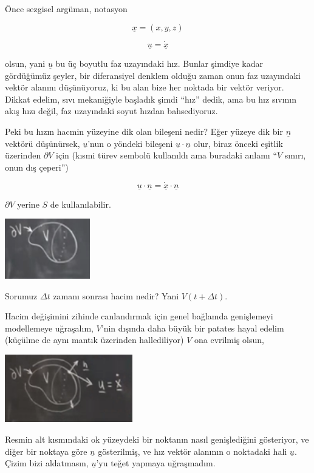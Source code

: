 \documentclass[12pt,fleqn]{article}\usepackage{../../common}
\begin{document}
Önce sezgisel argüman, notasyon 

$$ \underline{x} = (x,y,z)$$

$$ \underline{u} = \dot{\underline{x}} $$

olsun, yani $\underline{u}$ bu üç boyutlu faz uzayındaki hız. Bunlar şimdiye
kadar gördüğümüz şeyler, bir diferansiyel denklem olduğu zaman onun faz
uzayındaki vektör alanını düşünüyoruz, ki bu alan bize her noktada bir
vektör veriyor. Dikkat edelim, sıvı mekaniğiyle başladık şimdi ``hız''
dedik, ama bu hız sıvının akış hızı değil, faz uzayındaki soyut hızdan
bahsediyoruz.

Peki bu hızın hacmin yüzeyine dik olan bileşeni nedir? Eğer yüzeye dik bir
$\underline{n}$ vektörü düşünürsek, $\underline{u}$'nun o yöndeki bileşeni
$\underline{u} \cdot \underline{n}$ olur, biraz önceki eşitlik üzerinden
${\partial V}$ için (kısmi türev sembolü kullanıldı ama buradaki anlamı
``$V$ sınırı, onun dış çeperi'')

$$ 
\underline{u} \cdot \underline{n} = \dot{\underline{x}} \cdot \underline{n}
$$

${\partial V}$ yerine $S$ de kullanılabilir. 

\includegraphics[width=10em]{16_02.png}

Sorumuz $\Delta t$ zamanı sonrası hacim nedir? Yani $V(t + \Delta t)$. 

Hacim değişimini zihinde canlandırmak için genel bağlamda genişlemeyi
modellemeye uğraşalım, $V$'nin dışında daha büyük bir patates hayal edelim
(küçülme de aynı mantık üzerinden hallediliyor) $V$ ona evrilmiş olsun,

\includegraphics[width=15em]{16_03.png}

Resmin alt kısmındaki ok yüzeydeki bir noktanın nasıl genişlediğini
gösteriyor, ve diğer bir noktaya göre $\underline{n}$ gösterilmiş, ve hız
vektör alanının o noktadaki hali $\underline{u}$. Çizim bizi aldatmasın,
$\underline{u}$'yu teğet yapmaya uğraşmadım. 
\end{document}
